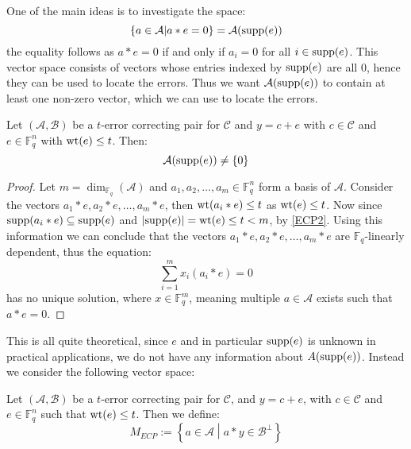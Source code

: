 One of the main ideas is to investigate the space:
\begin{equation*}
  \left\{a \in \mathcal{A} \middle| a * e = 0\right\} = \mathcal{A}(\textnormal{supp}(e))
\end{equation*}
the equality follows as $a * e = 0$ if and only if $a_i = 0$ for all $i \in \textnormal{supp}(e)$. This vector space consists of vectors whose entries indexed by $\textnormal{supp}(e)$ are all $0$, hence they can be used to locate the errors. Thus we want $\mathcal{A}(\textnormal{supp}(e))$ to contain at least one non-zero vector, which we can use to locate the errors.
\begin{lemma}\label{lem:A_e_is_non_zero}
  Let $(\mathcal{A}, \mathcal{B})$ be a $t$-error correcting pair for $\mathcal{C}$ and $y = c + e$ with $c \in \mathcal{C}$ and $e \in \mathbb{F}_q^n$ with $\mathrm{wt}(e) \leq t$. Then:
  \begin{equation*}
    \mathcal{A}(\textnormal{supp}(e)) \neq \left\{0\right\}
  \end{equation*}
\end{lemma}
\begin{proof}
  Let $m = \dim_{\mathbb{F}_q}(\mathcal{A})$ and $a_1, a_2, \ldots, a_{m} \in \mathbb{F}_q^n$ form a basis of $\mathcal{A}$. Consider the vectors $a_1 * e, a_2 * e , \ldots, a_{m} * e$, then $\mathrm{wt}(a_{i} * e) \leq t$ as $\mathrm{wt}(e) \leq t$. Now since $\textnormal{supp}(a_i * e) \subseteq \textnormal{supp}(e)$ and $\left\lvert\textnormal{supp}(e)\right\rvert = \mathrm{wt}(e) \leq t < m$, by \ref{ECP2}. Using this information we can conclude that the vectors $a_1 * e, a_2 * e, \ldots, a_{m} * e$ are $\mathbb{F}_q$-linearly dependent, thus the equation:
  \begin{equation*}
    \sum_{i = 1}^m x_{i} (a_i * e) = 0
  \end{equation*}
  has no unique solution, where $x \in \mathbb{F}_q^m$, meaning multiple $a \in \mathcal{A}$ exists such that $a * e = 0$.
\end{proof}

This is all quite theoretical, since $e$ and in particular $\textnormal{supp}(e)$ is unknown in practical applications, we do not have any information about $A(\textnormal{supp}(e))$. Instead we consider the following vector space:
\begin{definition}
  Let $(\mathcal{A}, \mathcal{B})$ be a $t$-error correcting pair for $\mathcal{C}$, and $y = c + e$, with $c \in \mathcal{C}$ and $e \in \mathbb{F}_q^n$ such that $\mathrm{wt}(e) \leq t$. Then we define:
  \begin{equation*}
    M_{ECP} := \left\{a \in \mathcal{A} \middle| a * y \in \mathcal{B}^{\perp}\right\}
  \end{equation*}
\end{definition}

